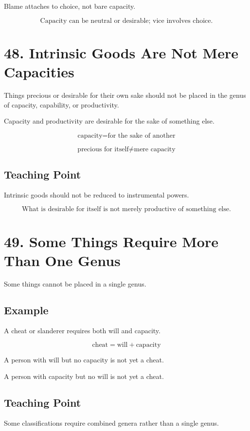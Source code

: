 \documentclass[12pt]{article}
\begin{document}
Blame attaches to choice, not bare capacity.

\[
\boxed{
\text{Capacity can be neutral or desirable; vice involves choice.}
}
\]

\section*{48. Intrinsic Goods Are Not Mere Capacities}

Things precious or desirable for their own sake should not be placed in the
genus of capacity, capability, or productivity.

Capacity and productivity are desirable for the sake of something else.

\[
\text{capacity} = \text{for the sake of another}
\]

\[
\text{precious for itself} \neq \text{mere capacity}
\]

\subsection*{Teaching Point}

Intrinsic goods should not be reduced to instrumental powers.

\[
\boxed{
\text{What is desirable for itself is not merely productive of something else.}
}
\]

\section*{49. Some Things Require More Than One Genus}

Some things cannot be placed in a single genus.

\subsection*{Example}

A cheat or slanderer requires both will and capacity.

\[
\text{cheat} = \text{will} + \text{capacity}
\]

A person with will but no capacity is not yet a cheat.

A person with capacity but no will is not yet a cheat.

\subsection*{Teaching Point}

Some classifications require combined genera rather than a single genus.
\end{document}
